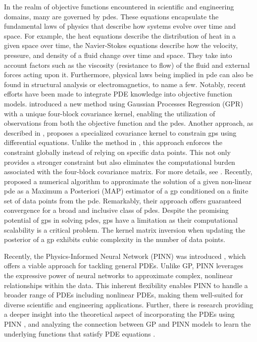 In the realm of objective functions encountered in scientific and engineering domains, many are governed by \acfp{pde}. These equations encapsulate the fundamental laws of physics that describe how systems evolve over time and space. For example, the heat equations describe the distribution of heat in a given space over time, the Navier-Stokes equations describe how the velocity, pressure, and density of a fluid change over time and space. They take into account factors such as the viscosity (resistance to flow) of the fluid and external forces acting upon it. Furthermore, physical laws being implied in \ac{pde} can also be found in structural analysis or electromagnetics, to name a few. Notably, recent efforts have been made to integrate PDE knowledge into objective function models. \citet{raissi2017machine}introduced a new method using Gaussian Processes Regression (GPR) with a unique four-block covariance kernel, enabling the utilization of observations from both the objective function and the \acp{pde}. Another approach, as described in \cite{jidling2017linearly}, proposes a specialized covariance kernel to constrain \acfp{gp} using differential equations. Unlike the method in \cite{raissi2017machine}, this approach enforces the constraint globally instead of relying on specific data points. This not only provides a stronger constraint but also eliminates the computational burden associated with the four-block covariance matrix. For more details, see \cite{swiler2020survey}. Recently, \cite{chen2021solving} proposed a numerical algorithm to approximate the solution of a given non-linear \ac{pde} as a Maximum a Posteriori (MAP) estimator of a \ac{gp} conditioned on a finite set of data points from the \ac{pde}. Remarkably, their approach offers guaranteed convergence for a broad and inclusive class of \acp{pde}. Despite the promising potential of \acp{gp} in solving \acp{pde}, \acp{gp} have a limitation as their computational scalability is a critical problem. The kernel matrix inversion when updating the posterior of a \ac{gp} exhibits cubic complexity in the number of data points.      


Recently, the Physics-Informed Neural Network (PINN) was introduced \cite{raissi2019physics,yang2021b}, which offers a viable approach for tackling general PDEs. Unlike GP, PINN leverages the expressive power of neural networks to approximate complex, nonlinear relationships within the data. This inherent flexibility enables PINN to handle a broader range of PDEs including nonlinear PDEs, making them well-suited for diverse scientific and engineering applications. Further, there is research providing a deeper insight into the theoretical aspect of incorporating the PDEs using PINN \cite{schiassi2021extreme,wangL2}, and analyzing the connection between GP and PINN models to learn the underlying functions that satisfy PDE equations \cite{wang2022and}. 

